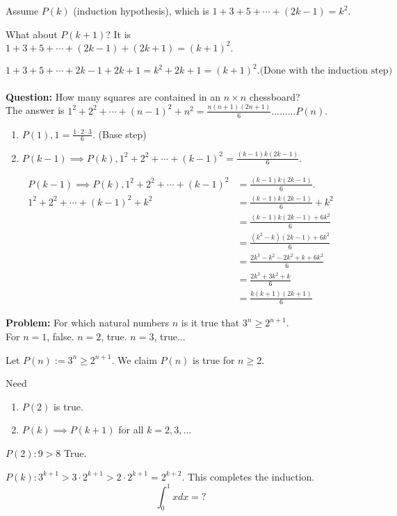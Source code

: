 \documentclass[a4paper, 11pt, twoside]{article}
\begin{document}
Assume $P(k)$ (induction hypothesis), which is $1+3+5+\cdots + (2k-1) = k^2.$

What about $P(k+1)$? It is $1+3+5+\cdots +(2k-1) + (2k+1) = (k+1)^2.$

\[1+3+5+\cdots + 2k-1 + 2k+1 = k^2 + 2k+1 = (k+1)^2. \text{(Done with the induction step)}\]\\

\textbf{Question:} How many squares are contained in an $n\times n$ chessboard?\\

The answer is $1^2+2^2+\cdots + (n-1)^2+n^2 = \frac{n(n+1)(2n+1)}{6}.........P(n).$

\begin{enumerate}
	\item $P(1), 1=\frac{1\cdot 2\cdot 3}{6}.$ (Base step)
	\item $P(k-1)\implies P(k), 1^2+2^2+\cdots + (k-1)^2 = \frac{(k-1)k(2k-1)}{6}.$
\end{enumerate}  

\[
\begin{split}
	P(k-1)\implies P(k), 1^2+2^2+\cdots + (k-1)^2 &= \frac{(k-1)k(2k-1)}{6}.\\
	1^2+2^2+\cdots + (k-1)^2 + k^2 &= \frac{(k-1)k(2k-1)}{6} + k^2 \\
	&= \frac{(k-1)k(2k-1)+6k^2}{6}\\
	&= \frac{(k^2-k)(2k-1)+6k^2}{6}\\
	&= \frac{2k^3-k^2-2k^2+k+6k^2}{6}\\
	&= \frac{2k^3+3k^2+k}{6}\\
	&= \frac{k(k+1)(2k+1)}{6}
\end{split}
\]

\textbf{Problem:} For which natural numbers $n$ is it true that $3^n \geq 2^{n+1}.$\\

For $n=1$, false. $n=2$, true. $n=3$, true...

Let $P(n):=3^n \geq 2^{n+1}.$ We claim $P(n)$ is true for $n\geq 2.$

Need \begin{enumerate}
	\item $P(2)$ is true.
	\item $P(k)\implies P(k+1)$ for all $k = 2, 3, \dots$
\end{enumerate}

$P(2): 9>8$ True.

$P(k): 3^{k+1} > 3 \cdot 2^{k+1} > 2\cdot 2^{k+1} = 2^{k+2}.$ This completes the induction.\\

\[\int_0^1xdx=?\]
\end{document}
